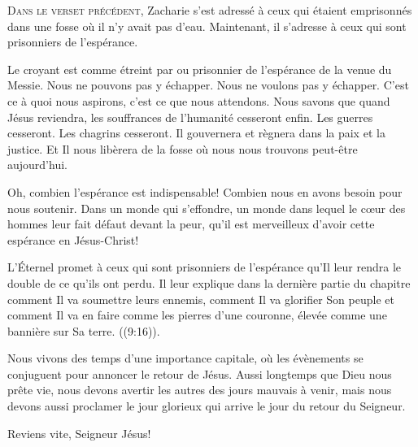 



\lettrine{D}{ans le verset précédent,} Zacharie s'est adressé à ceux
 qui étaient emprisonnés dans une fosse où il n'y avait pas d'eau.
 Maintenant, il s'adresse à ceux qui sont prisonniers de l'espérance. 

Le croyant est comme \og étreint par \fg{} ou \og prisonnier de \fg{}
 l'espérance de la venue du Messie. Nous ne pouvons pas y échapper.
 Nous ne voulons pas y échapper. C'est ce à quoi nous aspirons,
 c'est ce que nous attendons. Nous savons que quand Jésus reviendra,
 les souffrances de l'humanité cesseront enfin. Les guerres cesseront.
 Les chagrins cesseront. Il gouvernera et règnera dans la paix et la justice.
 Et Il nous libèrera de la fosse où nous nous trouvons peut-être aujourd'hui. 


Oh, combien l'espérance est indispensable! Combien nous en avons besoin
 pour nous soutenir. Dans un monde qui s'effondre, un monde dans lequel
 le cœur des hommes leur fait défaut devant la peur,
 qu'il est merveilleux d'avoir cette espérance en Jésus-Christ! 

L'Éternel promet à ceux qui sont prisonniers de l'espérance qu'Il leur rendra
 le double de ce qu'ils ont perdu. Il leur explique dans la dernière partie
 du chapitre comment Il va soumettre leurs ennemis, comment Il va glorifier
 Son peuple et comment Il va en faire comme les pierres d'une couronne,
 \og élevée comme une bannière sur Sa terre. \fg{} ((9:16)). 

Nous vivons des temps d'une importance capitale, où les évènements
 se conjuguent pour annoncer le retour de Jésus. Aussi longtemps que Dieu
 nous prête vie, nous devons avertir les autres des jours mauvais à venir,
 mais nous devons aussi proclamer le jour glorieux qui arrive
 \ocadr le jour du retour du Seigneur. 

Reviens vite, Seigneur Jésus! 

\dvrule


